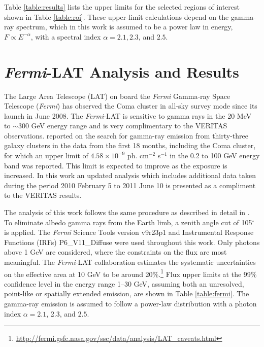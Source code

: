 \documentclass[12pt,manuscript]{aastex}
\def\Fermi{{\em Fermi}\xspace}
\begin{document}
Table \ref{table:results} lists the upper limits for the selected regions of interest shown in
Table \ref{table:roi}. These upper-limit calculations depend on the gamma-ray spectrum, which in
this work is assumed to be a power law in energy, $F\propto E^{-\alpha}$, with a spectral index
$\alpha=2.1, 2.3$, and $2.5$.

%
%

\section{\Fermi-LAT Analysis and Results}
The Large Area Telescope (LAT) on board the \Fermi Gamma-ray Space Telescope (\Fermi)
has observed the Coma cluster in all-sky survey mode since its launch in June 2008. The
\Fermi-LAT is sensitive to gamma rays in the 20 MeV to $\sim$300 GeV energy range and is
very complimentary to the VERITAS observations. \citet{article:Ackermann_etal:2010} reported on the
search for gamma-ray emission from thirty-three galaxy clusters in the data from the first 18
months, including the Coma cluster, for which an upper limit of $4.58\times 10^{-9}$ ph. cm$^{-2}$
s$^{-1}$ in the 0.2 to 100 GeV energy band was reported. This limit is expected to improve as the
exposure is increased. In this work an updated analysis which includes additional data taken during
the period 2010 February 5 to 2011 June 10 is presented as a compliment to the VERITAS results.

The analysis of this work follows the same procedure as described in detail in
\citet{article:Abdo_etal:2009}. To eliminate albedo gamma rays from the Earth limb, a zenith angle
cut of 105$^{\circ}$ is applied. The \Fermi Science Tools version v9r23p1 and Instrumental
Response Functions (IRFs) P6\_V11\_Diffuse were used throughout this work. Only photons above 1 GeV
are considered, where the constraints on the flux are most meaningful. The \Fermi-LAT collaboration
estimates the systematic uncertainties on the effective area at 10 GeV to be around
20\%.\footnote{\url{http://fermi.gsfc.nasa.gov/ssc/data/analysis/LAT\_caveats.html}} Flux upper
limits at the 99\% confidence level in the energy range 1--30 GeV, assuming both an unresolved,
point-like or spatially extended emission, are shown in Table \ref{table:fermi}. The gamma-ray
emission is assumed to follow a power-law distribution with a photon index $\alpha=2.1$, 2.3, and
$2.5$.

%
%
\end{document}
